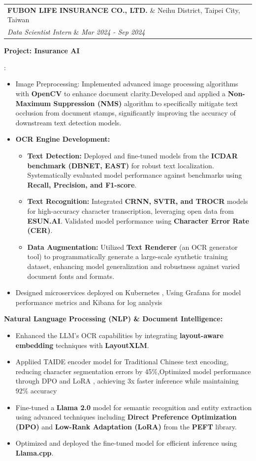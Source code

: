 \documentclass[letterpaper,10pt]{article}
\makeatletter
\newcommand{\resumeItem}[2]{
  \item\small{
    \textbf{#1}{: #2 \vspace{-2pt}}
  }
}
\newcommand{\resumeSubheading}[4]{
  \vspace{-1pt}\item[]
  \begin{tabular*}{0.98\textwidth}{l@{\extracolsep{\fill}}r}
      \hspace{-10pt}\textbf{#1} \& #2 \\
      \hspace{-10pt}\textit{\small#3} \& \textit{\small #4} \\
    \end{tabular*}\vspace{-5pt}
}
\newcommand{\resumeItemListStart}{\begin{itemize}}
\newcommand{\resumeItemListEnd}{\end{itemize}\vspace{-5pt}}
\makeatother
\begin{document}
\resumeSubheading
  {FUBON LIFE INSURANCE CO., LTD.}{Neihu District, Taipei City, Taiwan}
  {Data Scientist Intern}{Mar 2024 - Sep 2024}
  \resumeItemListStart
    \resumeItem{Project: Insurance AI}
            {
            \begin{itemize}
                \item Image Preprocessing: Implemented advanced image processing algorithms with \textbf{OpenCV} to enhance document clarity.Developed and applied a \textbf{Non-Maximum Suppression (NMS)} algorithm to specifically mitigate text occlusion from document stamps, significantly improving the accuracy of downstream text detection models. 
    \item \textbf{OCR Engine Development:}
    \begin{itemize}
        \item \textbf{Text Detection:} Deployed and fine-tuned models from the \textbf{ICDAR benchmark (DBNET, EAST)} for robust text localization. Systematically evaluated model performance against benchmarks using \textbf{Recall, Precision, and F1-score}.
        \item \textbf{Text Recognition:} Integrated \textbf{CRNN, SVTR, and TROCR} models for high-accuracy character transcription, leveraging open data from \textbf{ESUN.AI}. Validated model performance using \textbf{Character Error Rate (CER)}.
        \item \textbf{Data Augmentation:} Utilized \textbf{Text Renderer} (an OCR generator tool) to programmatically generate a large-scale synthetic training dataset, enhancing model generalization and robustness against varied document fonts and formats.
    \end{itemize}
                
                \item Designed microservices deployed on Kubernetes , Using Grafana for model performance metrics and Kibana for log analysis
            \end{itemize}
            \item \textbf{Natural Language Processing (NLP) \& Document Intelligence:}
    \begin{itemize}
        \item Enhanced the LLM's OCR capabilities by integrating \textbf{layout-aware embedding} techniques with \textbf{LayoutXLM}.
        \item Appliied TAIDE encoder model for Traditional Chinese text encoding, reducing character segmentation errors by 45\%,Optimized model performance through DPO and LoRA , achieving 3x faster inference while maintaining 92\% accuracy
        \item Fine-tuned a \textbf{Llama 2.0} model for semantic recognition and entity extraction using advanced techniques including \textbf{Direct Preference Optimization (DPO)} and \textbf{Low-Rank Adaptation (LoRA)} from the \textbf{PEFT} library.
        \item Optimized and deployed the fine-tuned model for efficient inference using \textbf{Llama.cpp}.
        
    \end{itemize}
    }
    \resumeItemListEnd
\end{document}
